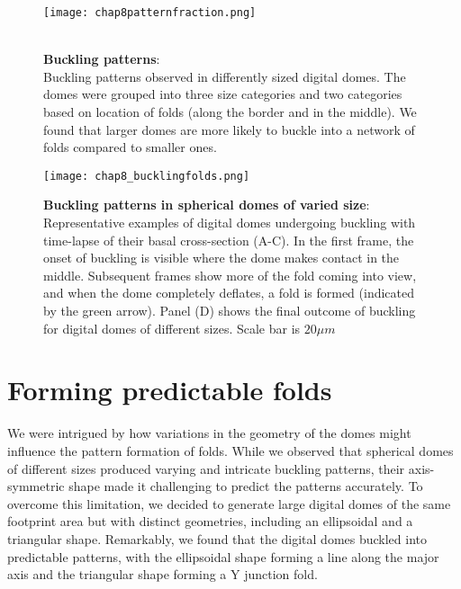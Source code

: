 \begin{figure}[]
	\begin{minipage}[c]{0.5\textwidth}
		\texttt{[image: chap8patternfraction.png]}
	\end{minipage}\hfill
	\begin{minipage}[c]{0.45\textwidth}
		\caption{\\ \textbf{Buckling patterns}:\\ 
			Buckling patterns observed in differently sized digital domes. The domes were grouped into three size categories and two categories based on location of folds (along the border and in the middle). We found that larger domes are more likely to buckle into a network of folds compared to smaller ones.
		} \label{fig_8_8}
	\end{minipage}
\end{figure}
\begin{figure}
	\centering
	\texttt{[image: chap8\_bucklingfolds.png]}
	\caption{\label{fig_8_5} \textbf{Buckling patterns in spherical domes of varied size}: Representative examples of digital domes undergoing buckling with time-lapse of their basal cross-section (A-C). In the first frame, the onset of buckling is visible where the dome makes contact in the middle. Subsequent frames show more of the fold coming into view, and when the dome completely deflates, a fold is formed (indicated by the green arrow). Panel (D) shows the final outcome of buckling for digital domes of different sizes. Scale bar is $20 \mu m$	}
\end{figure}

\hypertarget{forming-predictable-folds}{%
	\section{Forming predictable folds}\label{forming-predictable-folds}}

We were intrigued by how variations in the geometry of the domes might influence the pattern formation of folds. While we observed that spherical domes of different sizes produced varying and intricate buckling patterns, their axis-symmetric shape made it challenging to predict the patterns accurately. To overcome this limitation, we decided to generate large digital domes of the same footprint area but with distinct geometries, including an ellipsoidal and a triangular shape. Remarkably, we found that the digital domes buckled into predictable patterns, with the ellipsoidal shape forming a line along the major axis and the triangular shape forming a Y junction fold.

